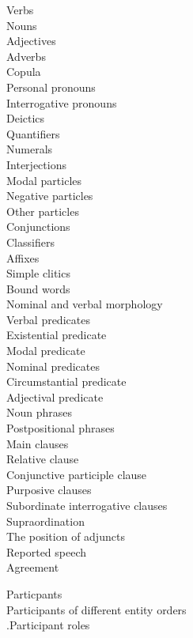 \begin{figure}
\parbox[t]{6cm}{
 Verbs\\
 Nouns\\
 Adjectives\\
 Adverbs\\
 Copula\\
 Personal pronouns\\
 Interrogative pronouns\\
 Deictics\\
 Quantifiers\\
 Numerals\\
 Interjections\\
 Modal particles\\
 Negative particles\\
 Other particles\\
 Conjunctions\\
 Classifiers\\ 
 Affixes\\
 Simple clitics\\
 Bound words\\
 Nominal and verbal morphology\\
 Verbal predicates\\
 Existential predicate\\
 Modal predicate\\
 Nominal predicates\\
 Circumstantial predicate\\
 Adjectival predicate \\
 Noun phrases\\  
 Postpositional phrases\\
 Main clauses\\
 Relative clause\\
 Conjunctive participle clause\\
 Purposive clauses\\
 Subordinate interrogative clauses\\
 Supraordination\\
 The position of adjuncts\\
 Reported speech\\
 Agreement\\
}
\parbox[t]{6cm}{
Particpants\\
Participants of different entity orders \\
.\hspace{.5cm}Participant roles \\
}
\end{figure}
